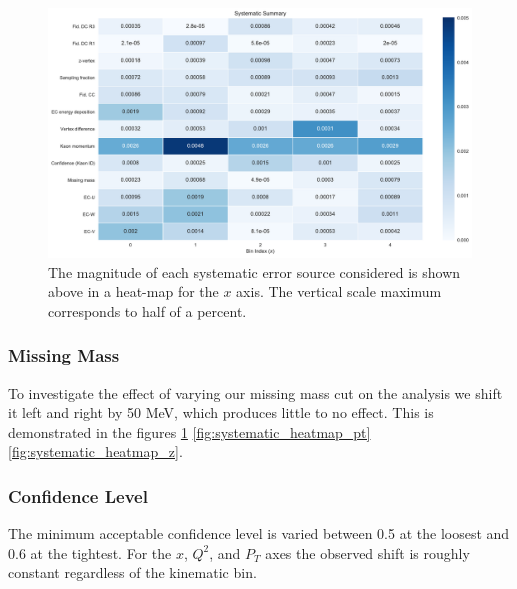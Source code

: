 \begin{figure}
	\label{fig:systematic_heatmap_x}
	\begin{center}
		\includegraphics[width=\textwidth]{image/plots/kaon-bsa/systematics_integrated_heatmap_x.pdf}
		\caption{The magnitude of each systematic error source considered is shown above in a heat-map for the $x$ axis.  The vertical scale maximum corresponds to half of a percent.}
	\end{center}
\end{figure}

\subsubsection*{Missing Mass}
To investigate the effect of varying our missing mass cut on the analysis we shift it left and right by 50 MeV, which produces little to no effect.  This is demonstrated in the figures \ref{fig:systematic_heatmap_x} \ref{fig:systematic_heatmap_pt} \ref{fig:systematic_heatmap_z}.  

\subsubsection*{Confidence Level}
The minimum acceptable confidence level is varied between 0.5 at the loosest and 0.6 at the tightest.  For the $x$, $Q^2$, and $P_T$ axes the observed shift is roughly constant regardless of the kinematic bin.  

